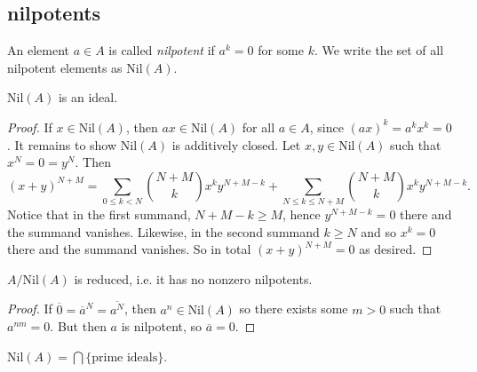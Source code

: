 \documentclass[12pt]{article}
\begin{document}

\subsection{nilpotents} %

\begin{definition}
	An element $a\in A$ is called \emph{nilpotent} if $a^k=0$ for some $k$. We write the set of all nilpotent elements as $\text{Nil}(A)$.
\end{definition}

\begin{proposition}
\label{prop_nil_is_ideal}
	$\text{Nil}(A)$ is an ideal.
\end{proposition}
\begin{proof}
	If $x\in\text{Nil}(A)$, then $ax\in\text{Nil}(A)$ for all $a\in A$, since $(ax)^k=a^kx^k=0$. It remains to show $\text{Nil}(A)$ is additively closed. Let $x,y\in\text{Nil}(A)$ such that $x^N=0=y^N$. Then 
	\begin{equation*}
		(x+y)^{N+M} = \sum_{0\leq k < N} {N+M\choose k} x^ky^{N+M-k} + \sum_{N\leq k\leq N+M} {N+M\choose k} x^ky^{N+M-k}.
	\end{equation*}
	Notice that in the first summand, $N+M-k\geq M$, hence $y^{N+M-k}=0$ there and the summand vanishes. Likewise, in the second summand $k\geq N$ and so $x^k=0$ there and the summand vanishes. So in total $(x+y)^{N+M}=0$ as desired.
\end{proof}

\begin{proposition}
	$A/\text{Nil}(A)$ is reduced, i.e. it has no nonzero nilpotents.
\end{proposition}
\begin{proof}
	If $\overline{0}=\overline{a}^N=\overline{a^N}$, then $a^n\in\text{Nil}(A)$ so there exists some $m>0$ such that $a^{nm}=0$. But then $a$ is nilpotent, so $\overline{a}=0$. 
\end{proof}

\begin{proposition}
\label{prop_nil_is_cap_spec}
	$\text{Nil}(A) = \bigcap \{\text{prime ideals}\}$.
\end{proposition}
\end{document}

